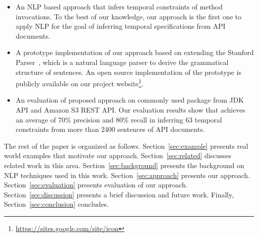 \begin{itemize}
	\item An NLP based approach that infers temporal constraints of method invocations. 
	To the best of our knowledge, our approach is the first one to apply NLP for the goal of inferring temporal specifications from API documents.
	\item A prototype implementation of our approach based on extending the Stanford Parser~\cite{Klein03,SNLP1}, which is a natural language parser to derive the grammatical structure of sentences.
	An open source implementation of the prototype is publicly available on our project website\footnote{\url{https://sites.google.com/site/icon}}. 
	\item An evaluation of proposed approach on 
commonly used package  from JDK API and Amazon
S3 REST API. Our evaluation results show that  achieves
an average of 70\% precision and 80\% recall in inferring 63
temporal constraints from more than 2400 sentences of API
documents.
\end{itemize}


The rest of the paper is organized as follows.
Section~\ref{sec:example} presents real world examples that motivate our approach.
Section~\ref{sec:related} discusses related work in this area.
Section~\ref{sec:background} presents the  background on NLP techniques used in this work.
Section~\ref{sec:approach} presents our approach.
Section~\ref{sec:evaluation} presents evaluation of our approach.
Section~\ref{sec:discussion} presents a brief discussion and future work.
Finally, Section~\ref{sec:conclusion} concludes.


